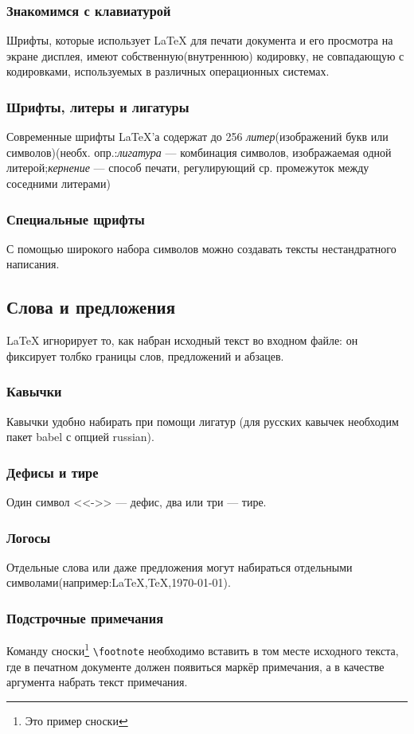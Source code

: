 \documentclass[a4paper,12pt]{article}
\begin{document}
\subsubsection{Знакомимся с клавиатурой}
Шрифты, которые использует \LaTeX{} для печати документа и его просмотра на экране дисплея, имеют собственную(внутреннюю) кодировку, не совпадающую с кодировками, используемых в различных операционных системах.
\subsubsection{Шрифты, литеры и лигатуры }
Современные шрифты \LaTeX'а содержат до 256 {\em литер}(изображений букв или символов)(необх. опр.:{\em лигатура} --- комбинация символов, изображаемая одной литерой;{\em кернение} --- способ печати, регулирующий ср. промежуток между соседними литерами)
\subsubsection{Специальные щрифты}
С помощью широкого набора символов можно создавать тексты нестандратного написания.
\subsection{Слова и предложения}
\LaTeX{} игнорирует то, как набран исходный текст во входном файле: он фиксирует толбко границы слов, предложений и абзацев.
\subsubsection{Кавычки}
Кавычки удобно набирать при помощи лигатур (для русских кавычек необходим пакет babel с опцией russian).
\subsubsection{Дефисы и тире}
Один символ <<->> --- дефис, два или три --- тире.
\subsubsection{Логосы}
Отдельные слова или даже предложения могут набираться отдельными символами(например:\LaTeX,\TeX,\today ).
\subsubsection{Подстрочные примечания}
Команду сноски\footnote {Это пример сноски} \verb=\footnote= необходимо вставить в том месте исходного текста, где в печатном документе должен появиться маркёр примечания, а в качестве аргумента набрать текст примечания.
\end{document}
